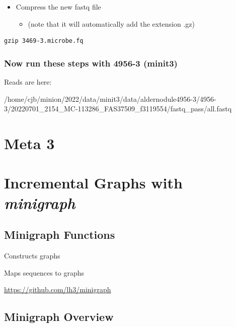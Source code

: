 \documentclass[
]{book}
\providecommand{\tightlist}{%
  \setlength{\itemsep}{0pt}\setlength{\parskip}{0pt}}
\begin{document}
\begin{itemize}
\tightlist
\item
  Compress the new fastq file

  \begin{itemize}
  \tightlist
  \item
    (note that it will automatically add the extension .gz)
  \end{itemize}
\end{itemize}

\begin{verbatim}
gzip 3469-3.microbe.fq
\end{verbatim}

\hypertarget{now-run-these-steps-with-4956-3-minit3}{%
\subsection*{Now run these steps with 4956-3 (minit3)}\label{now-run-these-steps-with-4956-3-minit3}}

Reads are here:

/home/cjb/minion/2022/data/minit3/data/aldernodule4956-3/4956-3/20220701\_2154\_MC-113286\_FAS37509\_f3119554/fastq\_pass/all.fastq

\hypertarget{meta-3}{%
\chapter{Meta 3}\label{meta-3}}

\hypertarget{incremental-graphs-with-minigraph}{%
\chapter{\texorpdfstring{Incremental Graphs with \emph{minigraph}}{Incremental Graphs with minigraph}}\label{incremental-graphs-with-minigraph}}

\hypertarget{minigraph-functions}{%
\section{Minigraph Functions}\label{minigraph-functions}}

Constructs graphs

Maps sequences to graphs

\url{https://github.com/lh3/minigraph}

\hypertarget{minigraph-overview}{%
\section{Minigraph Overview}\label{minigraph-overview}}
\end{document}
